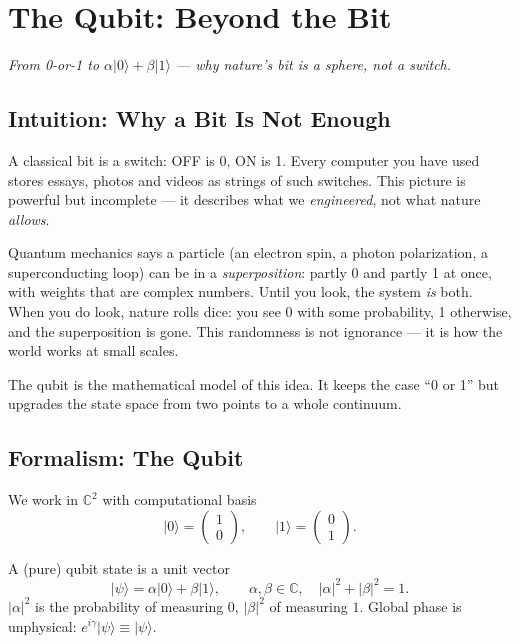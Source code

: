 \chapter{The Qubit: Beyond the Bit}\label{ch:qubit}
\begin{center}\small\textit{From 0-or-1 to $\alpha\lvert0\rangle+\beta\lvert1\rangle$ --- why nature's bit is a sphere, not a switch.}\end{center}

\section{Intuition: Why a Bit Is Not Enough}
A classical bit is a switch: OFF is 0, ON is 1. Every computer you have used stores essays, photos and videos as strings of such switches. This picture is powerful but incomplete --- it describes what we \emph{engineered}, not what nature \emph{allows}.

Quantum mechanics says a particle (an electron spin, a photon polarization, a superconducting loop) can be in a \emph{superposition}: partly 0 and partly 1 at once, with weights that are complex numbers. Until you look, the system \emph{is} both. When you do look, nature rolls dice: you see 0 with some probability, 1 otherwise, and the superposition is gone. This randomness is not ignorance --- it is how the world works at small scales.

The qubit is the mathematical model of this idea. It keeps the case ``0 or 1'' but upgrades the state space from two points to a whole continuum.

\section{Formalism: The Qubit}
We work in $\mathbb{C}^2$ with computational basis
\begin{equation}
\lvert0\rangle=\begin{pmatrix}1\\0\end{pmatrix},\qquad
\lvert1\rangle=\begin{pmatrix}0\\1\end{pmatrix}.
\end{equation}

\begin{definition}[Qubit]
A (pure) qubit state is a unit vector
\begin{equation}
\lvert\psi\rangle = \alpha\lvert0\rangle+\beta\lvert1\rangle,\qquad
\alpha,\beta\in\mathbb{C},\quad |\alpha|^2+|\beta|^2=1 .
\end{equation}
$|\alpha|^2$ is the probability of measuring $0$, $|\beta|^2$ of measuring $1$. Global phase is unphysical: $e^{i\gamma}\lvert\psi\rangle\equiv\lvert\psi\rangle$.
\end{definition}

